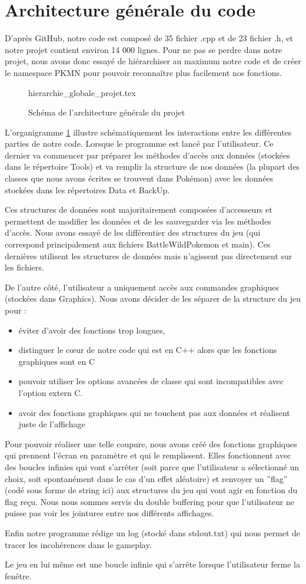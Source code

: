 \section{Architecture générale du code}

D'après GitHub, notre code est composé de 35 fichier .cpp et de 23 fichier .h, et notre projet contient environ 14 000 lignes. Pour ne pas se perdre dans notre projet, nous avons donc essayé de hiérarchiser au maximum notre code et de créer le namespace PKMN pour pouvoir reconnaître plus facilement nos fonctions. 

\begin{figure}[!h]\centering
{hierarchie_globale_projet.tex}
\caption{\label{ArchiGenerale}Schéma de l'architecture générale du projet}
\end{figure}

L'organigramme \ref{ArchiGenerale} illustre schématiquement les interactions entre les différentes parties de notre code. Lorsque le programme est lancé par l'utilisateur. Ce dernier va commencer par préparer les méthodes d'accès aux données (stockées dans le répertoire Tools) et va remplir la structure de nos données (la plupart des classes que nous avons écrites se trouvent dans Pokémon) avec les données stockées dans les répertoires Data et BackUp. 

Ces structures de données sont majoritairement composées d'accesseurs et permettent de modifier les données et de les sauvegarder via les méthodes d'accès. Nous avons essayé de les différentier des structures du jeu (qui correspond principalement aux fichiers BattleWildPokemon et main). Ces dernières utilisent les structures de données mais n'agissent pas directement sur les fichiers. 

De l'autre côté, l'utilisateur a uniquement accès aux commandes graphiques (stockées dans Graphics). Nous avons décider de les séparer de la structure du jeu pour :
\begin{itemize}
\item éviter d'avoir des fonctions trop longues,
\item  distinguer le cœur de notre code qui est en C++ alors que les fonctions graphiques sont en C
\item pouvoir utiliser les options avancées de classe qui sont incompatibles avec l'option extern C. 
\item avoir des fonctions graphiques qui ne touchent pas aux données et réalisent juste de l'affichage
\end{itemize}
Pour pouvoir réaliser une telle coupure, nous avons créé des fonctions graphiques qui prennent l'écran en paramètre et qui le remplissent. Elles fonctionnent avec des boucles infinies qui vont s’arrêter (soit parce que l'utilisateur a sélectionné un choix, soit spontanément dans le cas d'un effet aléatoire) et renvoyer un ''flag'' (codé sous forme de string ici) aux structures du jeu qui vont agir en fonction du flag reçu. Nous nous sommes servis du double buffering pour que l'utilisateur ne puisse pas voir les jointures entre nos différents affichages. 

Enfin notre programme rédige un log (stocké dans stdout.txt) qui nous permet de tracer les incohérences dans le gameplay. 

Le jeu en lui même est une boucle infinie qui s'arrête lorsque l'utilisateur ferme la fenêtre. 